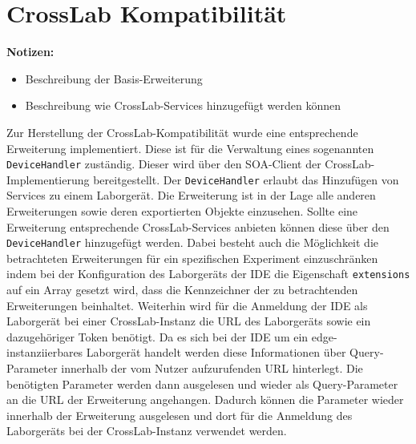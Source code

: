\section{CrossLab Kompatibilität}\label{section:prototypische-implementierung:crosslab-kompatibilität}

\begin{note}
    \textbf{Notizen:}
    \begin{itemize}
        \item Beschreibung der Basis-Erweiterung
        \item Beschreibung wie CrossLab-Services hinzugefügt werden können
    \end{itemize}
\end{note}

Zur Herstellung der CrossLab-Kompatibilität wurde eine entsprechende Erweiterung implementiert. Diese ist für die Verwaltung eines sogenannten \texttt{DeviceHandler} zuständig. Dieser wird über den SOA-Client der CrossLab-Implementierung bereitgestellt. Der \texttt{DeviceHandler} erlaubt das Hinzufügen von Services zu einem Laborgerät. Die Erweiterung ist in der Lage alle anderen Erweiterungen sowie deren exportierten Objekte einzusehen. Sollte eine Erweiterung entsprechende CrossLab-Services anbieten können diese über den \texttt{DeviceHandler} hinzugefügt werden. Dabei besteht auch die Möglichkeit die betrachteten Erweiterungen für ein spezifischen Experiment einzuschränken indem bei der Konfiguration des Laborgeräts der IDE die Eigenschaft \texttt{extensions} auf ein Array gesetzt wird, dass die Kennzeichner der zu betrachtenden Erweiterungen beinhaltet. Weiterhin wird für die Anmeldung der IDE als Laborgerät bei einer CrossLab-Instanz die URL des Laborgeräts sowie ein dazugehöriger Token benötigt. Da es sich bei der IDE um ein edge-instanziierbares Laborgerät handelt werden diese Informationen über Query-Parameter innerhalb der vom Nutzer aufzurufenden URL hinterlegt. Die benötigten Parameter werden dann ausgelesen und wieder als Query-Parameter an die URL der Erweiterung angehangen. Dadurch können die Parameter wieder innerhalb der Erweiterung ausgelesen und dort für die Anmeldung des Laborgeräts bei der CrossLab-Instanz verwendet werden.